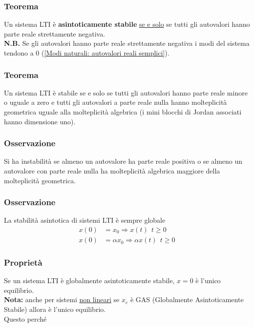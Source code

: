 \documentclass{article}
\begin{document}
\subsubsection*{Teorema}
Un sistema LTI è \textbf{asintoticamente stabile} \underline{se e solo} se tutti gli autovalori hanno parte reale strettamente negativa.
\vspace*{0.1cm}\\
\textbf{N.B.} Se gli autovalori hanno parte reale strettamente negativa i modi del sistema tendono a 0 (\ref{Modi naturali: autovalori reali semplici}).

\subsubsection*{Teorema}
Un sistema LTI è stabile se e solo se tutti gli autovalori hanno parte reale minore o uguale a zero e tutti gli autovalori a parte reale nulla hanno molteplicità geometrica uguale alla molteplicità algebrica (i mini blocchi di Jordan associati hanno dimensione uno).

\subsubsection*{Osservazione}
Si ha instabilità se almeno un autovalore ha parte reale positiva o se almeno un autovalore con parte reale nulla ha molteplicità algebrica maggiore della molteplicità geometrica.


\subsubsection*{Osservazione}
La stabilità asintotica di sistemi LTI è sempre globale
\begin{align*}
    x(0) &= x_0 \Longrightarrow x(t) \ \ t \geq 0 \\
    x(0) &= \alpha x_0 \Longrightarrow \alpha x(t) \ \ t \geq 0
\end{align*}


\subsubsection*{Proprietà}
Se un sistema LTI è globalmente asintoticamente stabile, $x=0$ è l'unico equilibrio.\\
\textbf{Nota:} anche per sistemi \underline{non lineari} se $x_e$ è GAS (Globalmente Asintoticamente Stabile) allora è l'unico equilibrio.
\vspace*{0.1cm}\\
Questo perché
\end{document}

